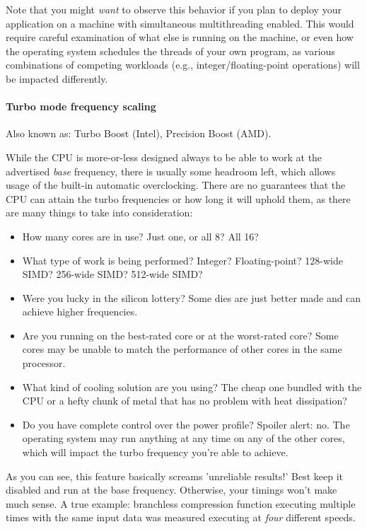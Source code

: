 \documentclass[hidelinks,titlepage,a4paper,twoside]{article}
\begin{document}
Note that you might \emph{want} to observe this behavior if you plan to deploy your application on a machine with simultaneous multithreading enabled. This would require careful examination of what else is running on the machine, or even how the operating system schedules the threads of your own program, as various combinations of competing workloads (e.g., integer/floating-point operations) will be impacted differently.

\paragraph{Turbo mode frequency scaling}

Also known as: Turbo Boost (Intel), Precision Boost (AMD).

While the CPU is more-or-less designed always to be able to work at the advertised \emph{base} frequency, there is usually some headroom left, which allows usage of the built-in automatic overclocking. There are no guarantees that the CPU can attain the turbo frequencies or how long it will uphold them, as there are many things to take into consideration:

\begin{itemize}
\item How many cores are in use? Just one, or all 8? All 16?
\item What type of work is being performed? Integer? Floating-point? 128-wide SIMD? 256-wide SIMD? 512-wide SIMD?
\item Were you lucky in the silicon lottery? Some dies are just better made and can achieve higher frequencies.
\item Are you running on the best-rated core or at the worst-rated core? Some cores may be unable to match the performance of other cores in the same processor.
\item What kind of cooling solution are you using? The cheap one bundled with the CPU or a hefty chunk of metal that has no problem with heat dissipation?
\item Do you have complete control over the power profile? Spoiler alert: no. The operating system may run anything at any time on any of the other cores, which will impact the turbo frequency you're able to achieve.
\end{itemize}

As you can see, this feature basically screams 'unreliable results!' Best keep it disabled and run at the base frequency. Otherwise, your timings won't make much sense. A true example: branchless compression function executing multiple times with the same input data was measured executing at \emph{four} different speeds.
\end{document}
